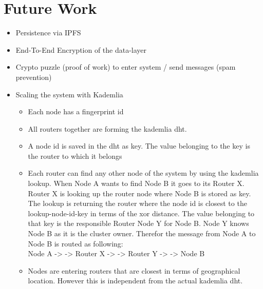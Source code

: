 \section{Future Work}
\begin{itemize}
    \item Persistence via IPFS
    \item End-To-End Encryption of the data-layer
    \item Crypto puzzle (proof of work) to enter system / send messages (spam prevention)
    \item Scaling the system with Kademlia
    \begin{itemize}
        \item Each node has a fingerprint id
        \item All routers together are forming the kademlia dht.
        \item A node id is saved in the dht as key. The value belonging to the key is the router to which it belongs 
        \item Each router can find any other node of the system by using the kademlia lookup. When Node A wants to find Node B it goes to its Router X. Router X is looking up the router node where Node B is stored as key. The lookup is returning the router where the node id is closest to the lookup-node-id-key in terms of the \gls{xor} distance. The value belonging to that key is the responsible Router Node Y for Node B. Node Y knows Node B as it is the cluster owner. Therefor the message from Node A to Node B is routed as following: \\ Node A -> -> Router X -> -> Router Y -> -> Node B
        \item Nodes are entering routers that are closest in terms of geographical location. However this is independent from the actual kademlia dht.
    \end{itemize}
\end{itemize}